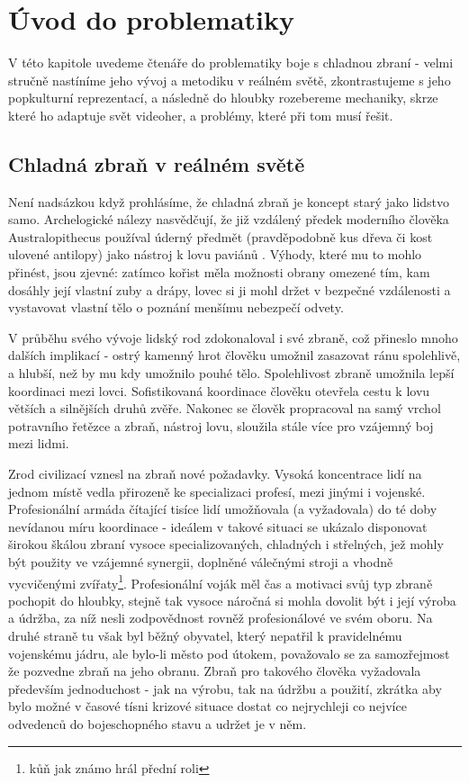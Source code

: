 \chapter{Úvod do problematiky}
V této kapitole uvedeme čtenáře do problematiky boje s chladnou zbraní - velmi stručně nastíníme jeho vývoj a metodiku v reálném světě, zkontrastujeme s jeho popkulturní reprezentací, a následně do hloubky rozebereme mechaniky, skrze které ho adaptuje svět videoher, a problémy, které při tom musí řešit.


\section{Chladná zbraň v reálném světě}
Není nadsázkou když prohlásíme, že chladná zbraň je koncept starý jako lidstvo samo. Archelogické nálezy nasvědčují, že již vzdálený předek moderního člověka Australopithecus používal úderný předmět (pravděpodobně kus dřeva či kost ulovené antilopy) jako nástroj k lovu paviánů \cite{AustralopithecusWeapon}. Výhody, které mu to mohlo přinést, jsou zjevné: zatímco kořist měla možnosti obrany omezené tím, kam dosáhly její vlastní zuby a drápy, lovec si ji mohl držet v bezpečné vzdálenosti a vystavovat vlastní tělo o poznání menšímu nebezpečí odvety.

V průběhu svého vývoje lidský rod zdokonaloval i své zbraně, což přineslo mnoho dalších implikací - ostrý kamenný hrot člověku umožnil zasazovat ránu spolehlivě, a hlubší, než by mu kdy umožnilo pouhé tělo. Spolehlivost zbraně umožnila lepší koordinaci mezi lovci. Sofistikovaná koordinace člověku otevřela cestu k lovu větších a silnějších druhů zvěře. Nakonec se člověk propracoval na samý vrchol potravního řetězce a zbraň, nástroj lovu, sloužila stále více pro vzájemný boj mezi lidmi. 

Zrod civilizací vznesl na zbraň nové požadavky. Vysoká koncentrace lidí na jednom místě vedla přirozeně ke specializaci profesí, mezi jinými i vojenské. Profesionální armáda čítající tisíce lidí umožňovala (a vyžadovala) do té doby nevídanou míru koordinace - ideálem v takové situaci se ukázalo disponovat širokou škálou zbraní vysoce specializovaných, chladných i střelných, jež mohly být použity ve vzájemné synergii, doplněné válečnými stroji a vhodně vycvičenými zvířaty\footnote{kůň jak známo hrál přední roli}. Profesionální voják měl čas a motivaci svůj typ zbraně pochopit do hloubky, stejně tak vysoce náročná si mohla dovolit být i její výroba a údržba, za níž nesli zodpovědnost rovněž profesionálové ve svém oboru. 
Na druhé straně tu však byl běžný obyvatel, který nepatřil k pravidelnému vojenskému jádru, ale bylo-li město pod útokem, považovalo se za samozřejmost že pozvedne zbraň na jeho obranu. Zbraň pro takového člověka vyžadovala především jednoduchost - jak na výrobu, tak na údržbu a použití, zkrátka aby bylo možné v časové tísni krizové situace dostat co nejrychleji co nejvíce odvedenců do bojeschopného stavu a udržet je v něm.

